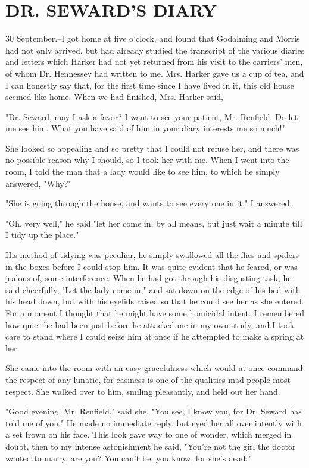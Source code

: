 \chapter{DR. SEWARD'S DIARY}

30 September.--I got home at five o'clock, and found that Godalming and Morris had not only arrived, but had already studied the transcript of the various diaries and letters which Harker had not yet returned from his visit to the carriers' men, of whom Dr. Hennessey had written to me. Mrs. Harker gave us a cup of tea, and I can honestly say that, for the first time since I have lived in it, this old house seemed like home. When we had finished, Mrs. Harker said, 

"Dr. Seward, may I ask a favor? I want to see your patient, Mr. Renfield. Do let me see him. What you have said of him in your diary interests me so much!" 

She looked so appealing and so pretty that I could not refuse her, and there was no possible reason why I should, so I took her with me. When I went into the room, I told the man that a lady would like to see him, to which he simply answered, "Why?" 

"She is going through the house, and wants to see every one in it," I answered. 

"Oh, very well," he said,"let her come in, by all means, but just wait a minute till I tidy up the place." 

His method of tidying was peculiar, he simply swallowed all the flies and spiders in the boxes before I could stop him. It was quite evident that he feared, or was jealous of, some interference. When he had got through his disgusting task, he said cheerfully, "Let the lady come in," and sat down on the edge of his bed with his head down, but with his eyelids raised so that he could see her as she entered. For a moment I thought that he might have some homicidal intent. I remembered how quiet he had been just before he attacked me in my own study, and I took care to stand where I could seize him at once if he attempted to make a spring at her. 

She came into the room with an easy gracefulness which would at once command the respect of any lunatic, for easiness is one of the qualities mad people most respect. She walked over to him, smiling pleasantly, and held out her hand. 

"Good evening, Mr. Renfield," said she. "You see, I know you, for Dr. Seward has told me of you." He made no immediate reply, but eyed her all over intently with a set frown on his face. This look gave way to one of wonder, which merged in doubt, then to my intense astonishment he said, "You're not the girl the doctor wanted to marry, are you? You can't be, you know, for she's dead." 

